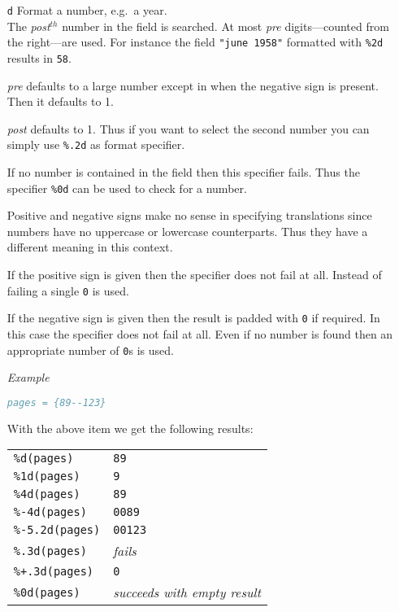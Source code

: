 \documentclass[11pt,a4paper]{scrbook}
\newenvironment{Example}{\smallskip\par\textit{Example}\par}{\smallskip\par}
\begin{document}
\begin{itemize}
  \item [\texttt{d}] Format a number, e.g.\ a year.\\
    
    The \textit{post}$^{th}$ number in the field is searched. At most
    \textit{pre} digits---counted from the right---are used. For instance
    the field \texttt{"june 1958"} formatted with \texttt{\%2d} results in
    \texttt{58}.
    
    \textit{pre} defaults to a large number except in when the negative sign
    is present. Then it defaults to 1.
        
    \textit{post} defaults to 1. Thus if you want to select the second number
    you can simply use \texttt{\%.2d} as format specifier.
        
    If no number is contained in the field then this specifier fails. Thus the
    specifier \texttt{\%0d} can be used to check for a number.
    
    Positive and negative signs make no sense in specifying translations since
    numbers have no uppercase or lowercase counterparts. Thus they have a
    different meaning in this context.
    
    If the positive sign is given then the specifier does not fail at all.
    Instead of failing a single \verb|0| is used.
    
    If the negative sign is given then the result is padded with \verb|0| if
    required. In this case the specifier does not fail at all. Even if no
    number is found then an appropriate number of \verb|0|s is used.

    \begin{Example}
      \begin{lstlisting}[language=BibTeX]
  pages = {89--123}
      \end{lstlisting}\vspace{-2ex}
      With the above item we get the following results:
      
      \begin{tabular}{ll}
        \texttt{\%d(pages)}	& \texttt{89}			\\
        \texttt{\%1d(pages)}	& \texttt{9}			\\
        \texttt{\%4d(pages)}	& \texttt{89}			\\
        \texttt{\%-4d(pages)}	& \texttt{0089}			\\
        \texttt{\%-5.2d(pages)}	& \texttt{00123}		\\
        \texttt{\%.3d(pages)}	& \textit{fails}		\\
        \texttt{\%+.3d(pages)}	& \texttt{0}			\\
        \texttt{\%0d(pages)}	& \textit{succeeds with empty result}
      \end{tabular}
    \end{Example}


\end{itemize}
\end{document}
